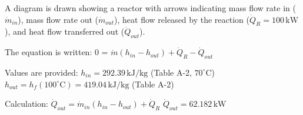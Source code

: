 A diagram is drawn showing a reactor with arrows indicating mass flow rate in (\( \dot{m}_{in} \)), mass flow rate out (\( \dot{m}_{out} \)), heat flow released by the reaction (\( \dot{Q}_R = 100 \, \text{kW} \)), and heat flow transferred out (\( \dot{Q}_{out} \)).  

The equation is written:  
0 = \( \dot{m} (h_{in} - h_{out}) + \dot{Q}_R - \dot{Q}_{out} \)  

Values are provided:  
\( h_{in} = 292.39 \, \text{kJ/kg} \) (Table A-2, \( 70^\circ \text{C} \))  
\( h_{out} = h_f (100^\circ \text{C}) = 419.04 \, \text{kJ/kg} \) (Table A-2)  

Calculation:  
\( \dot{Q}_{out} = \dot{m}_{in} (h_{in} - h_{out}) + \dot{Q}_R \)  
\( \dot{Q}_{out} = 62.182 \, \text{kW} \)